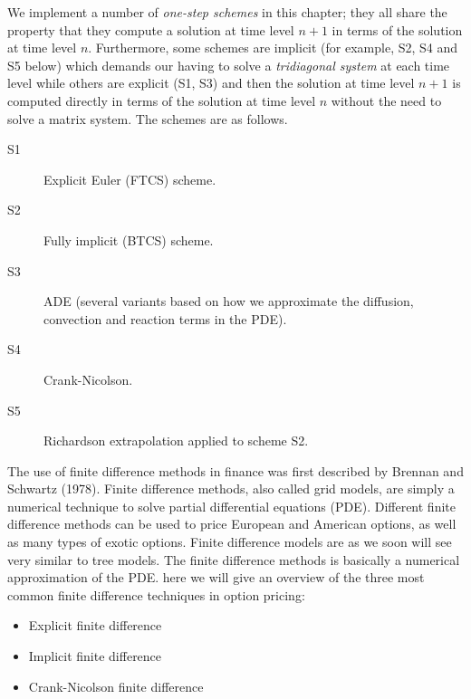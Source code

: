 \begin{frame}[t]{\secname}
We implement a number of \emph{one-step schemes} in this chapter; they all share the property that they compute a solution at time level $n+1$ in terms of the solution at time level $n$. Furthermore, some schemes are implicit (for example, S2, S4 and S5 below) which demands our having to solve a \emph{tridiagonal system} at each time level while others are explicit (S1, S3) and then the solution at time level $n+1$ is computed directly in terms of the solution at time level $n$ without the need to solve a matrix system. The schemes are as follows.
\begin{description}
	\item[S1] Explicit Euler (FTCS) scheme.
	\item[S2] Fully implicit (BTCS) scheme.
	\item[S3] ADE (several variants based on how we approximate the diffusion, convection and reaction terms in the PDE).
	\item[S4] Crank-Nicolson.
	\item[S5] Richardson extrapolation applied to scheme S2.
\end{description}
\end{frame}

\begin{frame}[t]{\secname}

\end{frame}

\begin{frame}[t]{\subsecname}
	The use of finite difference methods in finance was first described by Brennan and Schwartz (1978). Finite difference methods, also called grid models, are simply a numerical technique to solve partial differential equations (PDE). Different finite difference methods can be used to price European and American options, as well as many types of exotic options.
	Finite difference models are as we soon will see very similar to tree models. The finite difference methods is basically a numerical approximation of the PDE. here we will give an overview of the three most common finite difference techniques in option pricing:
	\begin{itemize}
		\item Explicit finite difference
		\item Implicit finite difference
		\item Crank-Nicolson finite difference
	\end{itemize}
\end{frame}

